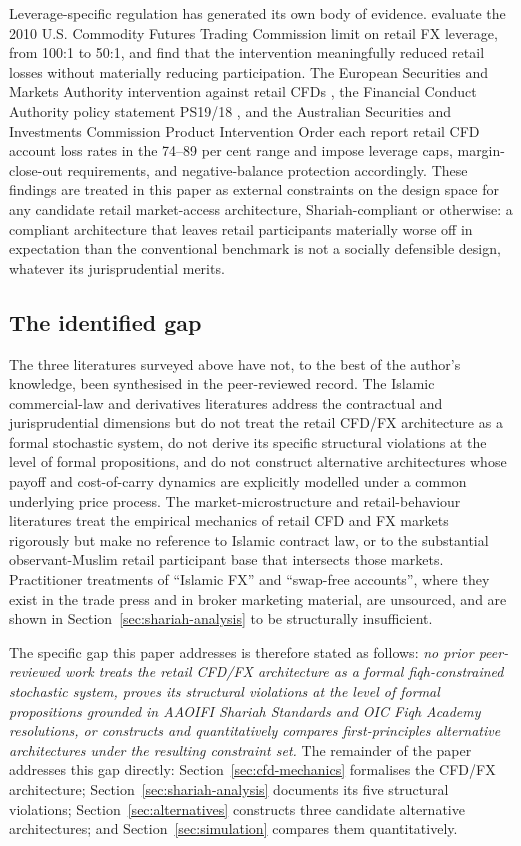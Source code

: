 \documentclass[preprint,12pt,authoryear]{elsarticle}
\theoremstyle{definition}
\begin{document}
Leverage-specific regulation has generated its own body of evidence.
\citet{HeimerSimsek2019} evaluate the 2010 U.S. Commodity Futures
Trading Commission limit on retail FX leverage, from 100:1 to 50:1,
and find that the intervention meaningfully reduced retail losses
without materially reducing participation. The European Securities and
Markets Authority intervention against retail CFDs
\citep{ESMA2018}, the Financial Conduct Authority policy statement
PS19/18 \citep{FCA2022}, and the Australian Securities and Investments
Commission Product Intervention Order \citep{ASIC2020} each report
retail CFD account loss rates in the 74--89 per cent range and impose
leverage caps, margin-close-out requirements, and negative-balance
protection accordingly. These findings are treated in this paper as
external constraints on the design space for any candidate retail
market-access architecture, Shariah-compliant or otherwise: a
compliant architecture that leaves retail participants materially worse
off in expectation than the conventional benchmark is not a socially
defensible design, whatever its jurisprudential merits.

\subsection{The identified gap}
\label{sec:lit-gap}

The three literatures surveyed above have not, to the best of the
author's knowledge, been synthesised in the peer-reviewed record. The
Islamic commercial-law and derivatives literatures address the
contractual and jurisprudential dimensions but do not treat the retail
CFD/FX architecture as a formal stochastic system, do not derive its
specific structural violations at the level of formal propositions,
and do not construct alternative architectures whose payoff and
cost-of-carry dynamics are explicitly modelled under a common
underlying price process. The market-microstructure and
retail-behaviour literatures treat the empirical mechanics of retail
CFD and FX markets rigorously but make no reference to Islamic
contract law, or to the substantial observant-Muslim retail
participant base that intersects those markets. Practitioner treatments
of ``Islamic FX'' and ``swap-free accounts'', where they exist in
the trade press and in broker marketing material, are unsourced,
and are shown in Section~\ref{sec:shariah-analysis} to be structurally
insufficient.

The specific gap this paper addresses is therefore stated as follows:
\emph{no prior peer-reviewed work treats the retail CFD/FX architecture
as a formal fiqh-constrained stochastic system, proves its structural
violations at the level of formal propositions grounded in AAOIFI
Shariah Standards and OIC Fiqh Academy resolutions, or constructs and
quantitatively compares first-principles alternative architectures
under the resulting constraint set.} The remainder of the paper
addresses this gap directly:
Section~\ref{sec:cfd-mechanics} formalises the CFD/FX architecture;
Section~\ref{sec:shariah-analysis} documents its five structural
violations; Section~\ref{sec:alternatives} constructs three candidate
alternative architectures; and Section~\ref{sec:simulation}
compares them quantitatively.
\end{document}
